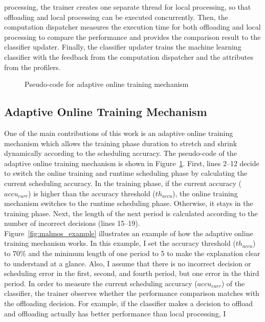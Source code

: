{{processing, the trainer creates one separate thread for local
processing, so that offloading and local processing can be executed
concurrently.
%
Then, the computation dispatcher measures the execution time for both
offloading and local processing to compare the performance and provides
the comparison result to the classifier updater. 
%
Finally, the classifier updater trains the machine learning classifier 
with the feedback from the computation dispatcher and the attributes
from the profilers.
%
\begin{figure}
\centering
{}
\caption{Pseudo-code for adaptive online training mechanism}
\label{fig:malmos_algorithm}
\end{figure}
%

\subsection{Adaptive Online Training Mechanism}
\label{online:module}
One of the main contributions of this work is an adaptive online
training mechanism which allows the training phase duration to stretch
and shrink dynamically according to the scheduling accuracy.
%
The pseudo-code of the adaptive online training mechanism is shown in
Figure~\ref{fig:malmos_algorithm}.
%
First, lines 2--12 decide to switch the online training and runtime
scheduling phase by calculating the current scheduling accuracy.
%
In the training phase, if the current accuracy ($accu_{curr}$) is higher
than the accuracy threshold ($th_{accu}$), the online training mechanism
switches to the runtime scheduling phase.
%
Otherwise, it stays in the training phase.
%
Next, the length of the next period is calculated according to the
number of incorrect decisions (lines 15--19).\\
%
Figure~\ref{fig:malmos_example} illustrates an example of how the adaptive online
training mechanism works.
%
In this example, I set the accuracy threshold ($th_{accu}$) to 70\% and
the minimum length of one period to 5 to make the explanation clear to
understand at a glance.
%
Also, I assume that there is no incorrect decision or scheduling error
in the first, second, and fourth period, but one error in the third
period.
%
In order to measure the current scheduling accuracy ($accu_{curr}$) of
the classifier, the trainer observes whether the performance comparison
matches with the offloading decision.
%
For example, if the classifier makes a decision to offload and
offloading actually has better performance than local processing, I
}}
